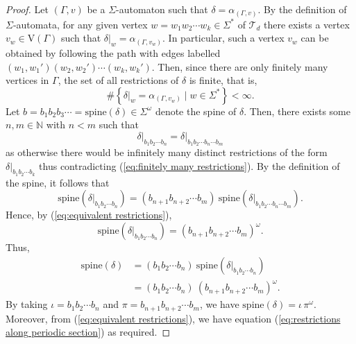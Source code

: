 \begin{proof}
	Let $(\Gamma,v)$ be a $\Sigma$-automaton such that $\delta = \alpha_{(\Gamma,v)}$.
	By the definition of $\Sigma$-automata, for any given vertex $w = w_1 w_2 \cdots w_k \in \Sigma^*$ of $\mathcal{T}_d$ there exists a vertex $v_w \in \mathrm{V}(\Gamma)$ such that $\delta\vert_w = \alpha_{(\Gamma,v_w)}$.
	In particular, such a vertex $v_w$ can be obtained by following the path with edges labelled
	$
	(w_1, w_1')
	(w_2, w_2')
	\cdots
	(w_k, w_k')
	$.
	Then, since there are only finitely many vertices in $\Gamma$, the set of all restrictions of $\delta$ is finite, that is,
	\begin{equation}\label{eq:finitely many restrictions}
		\#
		\left\{
			\left.\delta\right\vert_w
			=
			\alpha_{(\Gamma,v_w)}
		\mid
			w \in \Sigma^*
		\right\}
		<
		\infty.
	\end{equation}
	Let $b = b_1 b_2 b_3 \cdots = \mathrm{spine}(\delta) \in \Sigma^\omega$ denote the spine of $\delta$.
	Then, there exists some $n,m \in \mathbb{N}$ with $n < m$ such that
	\begin{equation}
		\label{eq:equivalent restrictions}
		\delta\vert_{b_1 b_2 \cdots b_n}
		=
		\delta\vert_{b_1 b_2 \cdots b_n \cdots b_{m}}
	\end{equation}
	as otherwise there would be infinitely many distinct restrictions of the form $\delta\vert_{b_1 b_2 \cdots b_k}$ thus contradicting (\ref{eq:finitely many restrictions}).
	By the definition of the spine, it follows that
	\[
	\mathrm{spine}
	\left(
	\delta\vert_{b_1 b_2 \cdots b_n}
	\right)
	=
	(b_{n+1}b_{n+2} \cdots b_m)
	\ 
	\mathrm{spine}
	\left(
	\delta\vert_{b_1 b_2 \cdots b_n \cdots b_{m}}
	\right).
	\]
	Hence, by (\ref{eq:equivalent restrictions}),
	\[
	\mathrm{spine}
	\left(
	\delta\vert_{b_1 b_2 \cdots b_n}
	\right)
	=
	(b_{n+1}b_{n+2} \cdots b_m)^\omega.
	\]
	Thus,
	\begin{align*}
		\mathrm{spine}(\delta)
		&=
		(b_1 b_2 \cdots b_n)
		\ 
		\mathrm{spine}
		\left(
		\delta\vert_{b_1 b_2 \cdots b_n}
		\right)
		\\&=
		(b_1 b_2 \cdots b_n)
		\ 
		(b_{n+1}b_{n+2} \cdots b_m)^\omega.
	\end{align*}
	By taking $\iota = b_1 b_2 \cdots b_n$ and $\pi = b_{n+1} b_{n+2} \cdots b_m$, we have $\mathrm{spine}(\delta) = \iota\,\pi^\omega$.
	Moreover, from (\ref{eq:equivalent restrictions}), we have equation (\ref{eq:restrictions along periodic section}) as required.
\end{proof}

